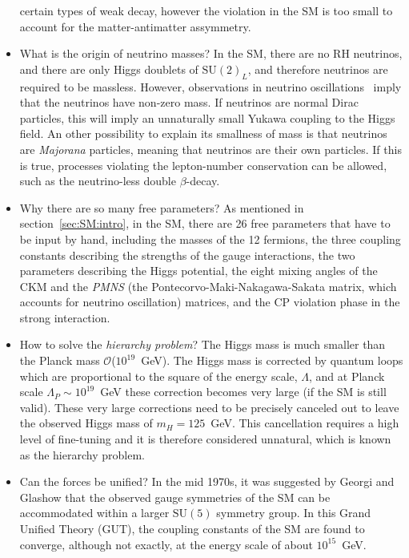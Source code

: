 \begin{itemize}
certain types of weak decay, however the violation in the SM is too small to account for the matter-antimatter
assymmetry.
    \item What is the origin of neutrino masses? 
In the SM, there are no RH neutrinos, and 
there are only Higgs doublets of $\text{SU}(2)_L$, and therefore neutrinos are required to be massless. 
However, observations in neutrino oscillations~\cite{neutrino1, neutrino2} 
imply that the neutrinos have non-zero mass. If neutrinos are normal Dirac 
particles, this will imply an unnaturally small Yukawa coupling to the Higgs field. An other possibility 
to explain its smallness of mass is that neutrinos are \textit{Majorana} particles, 
meaning that neutrinos are their own particles. If this is true, 
processes violating the lepton-number conservation can be allowed, such as the neutrino-less double $\beta$-decay.
    \item Why there are so many free parameters?
As mentioned in section~\ref{sec:SM:intro}, in the SM, there are 26 free parameters 
that have to be input by hand, including the masses of the 12 fermions, the three coupling constants describing the strengths
of the gauge interactions, the two parameters describing the Higgs potential, the eight mixing angles
of the CKM and the \textit{PMNS} (the Pontecorvo-Maki-Nakagawa-Sakata matrix, which accounts for neutrino oscillation) 
matrices, and the CP violation phase in the strong interaction. 
    \item How to solve the \textit{hierarchy problem}? 
The Higgs mass is much smaller than the 
Planck mass $\mathcal{O}$($10^{19}$~GeV). 
The Higgs mass is corrected by quantum loops which are proportional to the square 
of the energy scale, $\Lambda$, and at Planck scale $\Lambda_P\sim10^{19}$~GeV 
these correction becomes very large (if the SM is still valid).
These very large corrections need to be precisely canceled
out to leave the observed Higgs mass of $m_H = 125$~GeV. 
This cancellation requires a high level of fine-tuning and it is therefore considered unnatural,
which is known as the hierarchy problem.
    \item Can the forces be unified? 
In the mid 1970s, it was suggested by Georgi and Glashow that the observed gauge symmetries
of the SM can be accommodated within a larger $\text{SU}(5)$ symmetry group. 
In this Grand Unified Theory (GUT), the coupling constants of the SM are found to 
converge, although not exactly, at the energy scale of about $10^{15}$~GeV.


\end{itemize}

